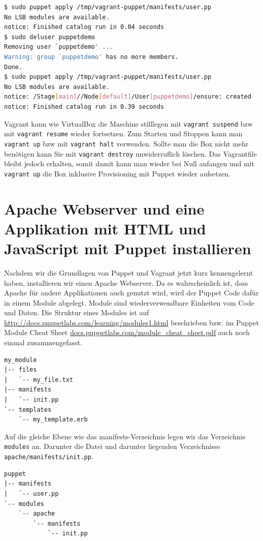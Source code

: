 \documentclass[12pt,a4paper,ngerman]{article}
\begin{document}
\begin{lstlisting}[language=sh,caption=Puppet apply im Box, label=vagrant-apply]
$ sudo puppet apply /tmp/vagrant-puppet/manifests/user.pp
No LSB modules are available.
notice: Finished catalog run in 0.04 seconds
$ sudo deluser puppetdemo
Removing user `puppetdemo' ...
Warning: group `puppetdemo' has no more members.
Done.
$ sudo puppet apply /tmp/vagrant-puppet/manifests/user.pp
No LSB modules are available.
notice: /Stage[main]//Node[default]/User[puppetdemo]/ensure: created
notice: Finished catalog run in 0.39 seconds
\end{lstlisting}

Vagrant kann wie VirtualBox die Maschine stilllegen mit \lstinline$vagrant suspend$ bzw mit \lstinline$vagrant resume$ wieder fortsetzen. Zum Starten und Stoppen kann man \lstinline$vagrant up$ bzw mit \lstinline$vagrant halt$ verwenden.  Sollte man die Box nicht mehr benötigen kann Sie mit \lstinline$vagrant destroy$ unwiderruflich löschen. Das Vagrantfile bleibt jedoch erhalten, somit damit kann man wieder bei Null anfangen und mit \lstinline$vagrant up$ die Box inklusive Provisioning mit Puppet wieder aufsetzen.

\section{Apache Webserver und eine Applikation mit HTML und JavaScript mit Puppet installieren}
Nachdem wir die Grundlagen von Puppet und Vagrant jetzt kurz kennengelernt haben, installieren wir einen Apache Webserver. Da es wahrscheinlich ist, dass Apache für andere Applikationen auch genutzt wird, wird der Puppet Code dafür in einem Module abgelegt. Module sind wiederverwendbare Einheiten vom Code und Daten. Die Struktur eines Modules ist auf \url{http://docs.puppetlabs.com/learning/modules1.html} beschrieben bzw. im Puppet Module Cheat Sheet \url{docs.puppetlabs.com/module_cheat_sheet.pdf} auch noch einmal zusammengefasst.

\begin{lstlisting}[language=tree,caption=Puppet Module Struktur, label=module_structure]
my_module
|-- files
|   `-- my_file.txt
|-- manifests
|   `-- init.pp
`-- templates
    `-- my_template.erb
\end{lstlisting}


Auf die gleiche Ebene wie das manifests-Verzeichnis legen wir das Verzeichnis \lstinline$modules$ an. Darunter die Datei und darunter liegenden Verzeichnisse \lstinline$apache/manifests/init.pp$.
\begin{lstlisting}[language=tree,caption=Verzeichnisstruktur für den apache-Module, label=apache-module]
puppet
|-- manifests
|   `-- user.pp
`-- modules
    `-- apache
        `-- manifests
            `-- init.pp
\end{lstlisting}
\end{document}
